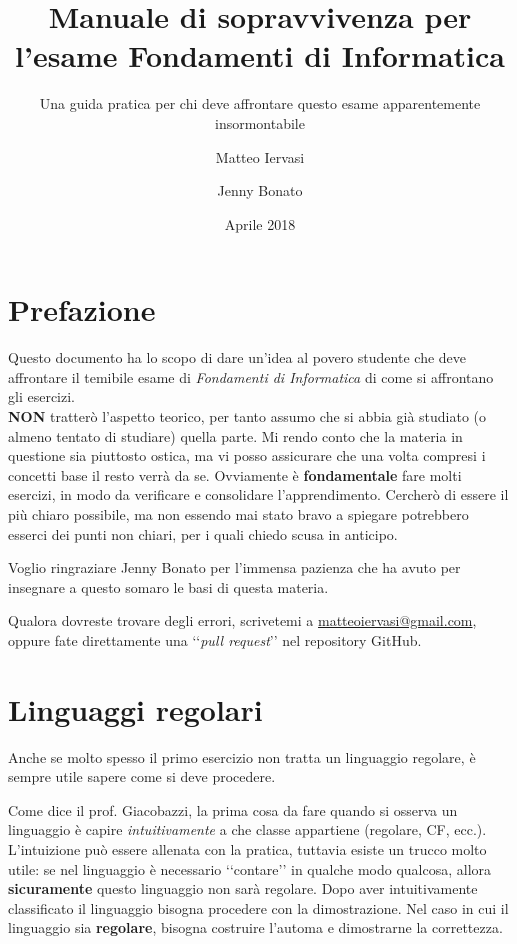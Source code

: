 \documentclass[a4paper,oneside]{scrbook}
\title{Manuale di sopravvivenza per l'esame Fondamenti di Informatica}
\subtitle{Una guida pratica per chi deve affrontare questo esame apparentemente insormontabile}
\author{Matteo Iervasi \and Jenny Bonato}
\date{Aprile 2018}
\begin{document}
	
\maketitle
\tableofcontents

\chapter*{Prefazione}
Questo documento ha lo scopo di dare un'idea al povero studente che deve affrontare il temibile esame di \textit{Fondamenti di Informatica} di come si affrontano gli esercizi.\\
\textbf{{\large NON}} tratterò l'aspetto teorico, per tanto assumo che si abbia già studiato (o almeno tentato di studiare) quella parte.
Mi rendo conto che la materia in questione sia piuttosto ostica, ma vi posso assicurare che una volta compresi i concetti base il resto verrà da se.
Ovviamente è \textbf{fondamentale} fare molti esercizi, in modo da verificare e consolidare l'apprendimento. Cercherò di essere il più chiaro possibile, ma non essendo mai stato bravo
a spiegare potrebbero esserci dei punti non chiari, per i quali chiedo scusa in anticipo.

Voglio ringraziare Jenny Bonato per l'immensa pazienza che ha avuto per insegnare a questo somaro le basi di questa materia.

Qualora dovreste trovare degli errori, scrivetemi a \href{mailto:matteoiervasi@gmail.com}{matteoiervasi@gmail.com}, oppure fate direttamente una ‘‘\textit{pull request}’’ nel repository GitHub.

\chapter{Linguaggi regolari}
Anche se molto spesso il primo esercizio non tratta un linguaggio regolare, è sempre utile sapere come si deve procedere.

Come dice il prof. Giacobazzi, la prima cosa da fare quando si osserva un linguaggio è capire \textit{intuitivamente} a che classe appartiene (regolare, CF, ecc.).
L'intuizione può essere allenata con la pratica, tuttavia esiste un trucco molto utile: se nel linguaggio è necessario ‘‘contare’’ in qualche modo qualcosa, allora \textbf{sicuramente}
questo linguaggio non sarà regolare. Dopo aver intuitivamente classificato il linguaggio bisogna procedere con la dimostrazione. Nel caso in cui il linguaggio sia \textbf{regolare}, bisogna costruire l'automa e dimostrarne la correttezza.
\end{document}
